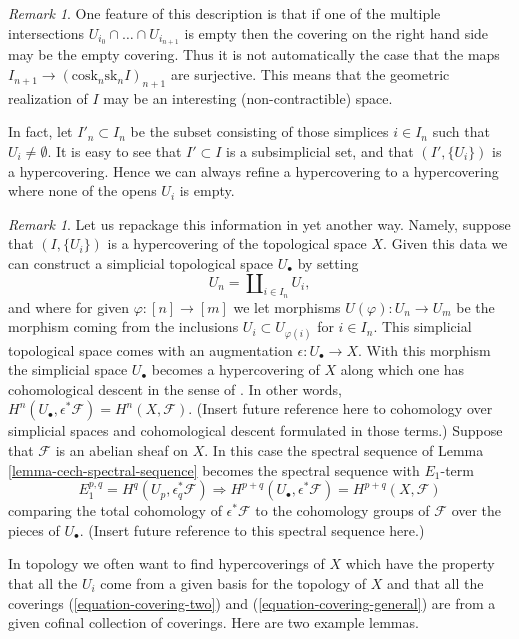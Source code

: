 \documentclass{stacks-project}
\theoremstyle{plain}
\theoremstyle{definition}
\theoremstyle{remark}
\newtheorem{remark}[subsection]{Remark}
\numberwithin{equation}{subsection}
\begin{document}
\begin{remark}
\label{remark-not-covering-set}
One feature of this description is that if one of the multiple
intersections $U_{i_0} \cap \ldots \cap U_{i_{n + 1}}$ is empty then
the covering on the right hand side may be the empty covering.
Thus it is not automatically the case that the maps
$I_{n + 1} \to (\text{cosk}_n\text{sk}_n I)_{n + 1}$ are surjective.
This means that the geometric realization of $I$ may be an interesting
(non-contractible) space.

\medskip\noindent
In fact, let $I'_n \subset I_n$ be the subset
consisting of those simplices $i \in I_n$ such that
$U_i \not = \emptyset$. It is easy to see that $I' \subset I$
is a subsimplicial set, and that $(I', \{U_i\})$ is a hypercovering.
Hence we can always refine a hypercovering to a hypercovering where
none of the opens $U_i$ is empty.
\end{remark}

\begin{remark}
\label{remark-repackage-into-simplicial-space}
Let us repackage this information in yet another way.
Namely, suppose that $(I, \{U_i\})$ is a hypercovering of
the topological space $X$. Given this data we can construct
a simplicial topological space $U_\bullet$ by setting
$$
U_n = \coprod\nolimits_{i \in I_n} U_i,
$$
and where for given $\varphi : [n] \to [m]$ we let
morphisms $U(\varphi) : U_n \to U_m$ be the morphism
coming from the inclusions $U_i \subset U_{\varphi(i)}$
for $i \in I_n$. This simplicial topological space comes
with an augmentation $\epsilon : U_\bullet \to X$.
With this morphism the simplicial space $U_\bullet$ becomes
a hypercovering of $X$ along which one has cohomological descent
in the sense of \cite[Expos\'e Vbis]{SGA4}.
In other words, $H^n(U_\bullet, \epsilon^*\mathcal{F}) = H^n(X, \mathcal{F})$.
(Insert future reference here to cohomology over simplicial
spaces and cohomological descent formulated in those terms.)
Suppose that $\mathcal{F}$ is an abelian sheaf on $X$.
In this case the spectral sequence of Lemma \ref{lemma-cech-spectral-sequence}
becomes the spectral sequence with $E_1$-term
$$
E_1^{p, q} = H^q(U_p, \epsilon_q^*\mathcal{F})
\Rightarrow
H^{p + q}(U_\bullet, \epsilon^*\mathcal{F}) = H^{p + q}(X, \mathcal{F})
$$
comparing the total cohomology of $\epsilon^*\mathcal{F}$
to the cohomology groups of $\mathcal{F}$ over the pieces
of $U_\bullet$. (Insert future reference to this spectral sequence
here.)
\end{remark}

\noindent
In topology we often want to find hypercoverings of $X$ which
have the property that all the $U_i$ come from a given basis for the topology
of $X$ and that all the coverings
(\ref{equation-covering-two}) and (\ref{equation-covering-general})
are from a given cofinal collection of coverings.
Here are two example lemmas.
\end{document}
